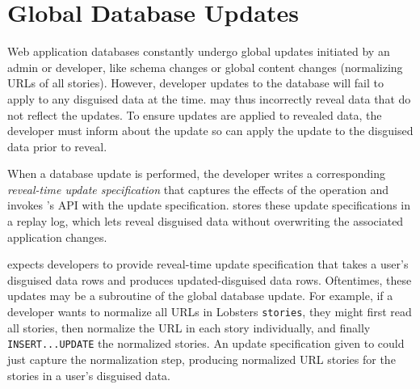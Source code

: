 %
%

\section{Global Database Updates} 
\label{s:overview:updates}

Web application databases constantly undergo global updates 
initiated by an admin or developer, like schema changes or global content
changes (\eg normalizing URLs of all stories). 
%
However, developer updates to the database will fail to apply to any disguised
data at the time. \sys may thus incorrectly reveal data that do not
reflect the updates. 
%
To ensure updates are applied to revealed data, the developer must inform \sys
about the update so \sys can apply the update to the disguised data prior to
reveal.

When a database update is performed, the developer writes a corresponding
\emph{reveal-time update specification} that captures the effects of the operation and
invokes \sys's API with the update specification.
\sys stores these update specifications in a replay log, which lets \sys reveal
disguised data without overwriting the associated application changes.
%
%

%

%
\sys expects developers to provide reveal-time update specification that takes
a user's disguised data rows and produces updated-disguised data rows.
%
Oftentimes, these updates may be a subroutine of the global
database update. 
%
For example, if a developer wants to normalize all URLs in Lobsters
\texttt{stories}, they might first read all stories, then normalize the URL in
each story individually, and finally \texttt{INSERT...UPDATE} the normalized
stories. 
%
An update specification given to \sys could just capture the normalization step,
producing normalized URL stories for the stories in a user's disguised data.
%

